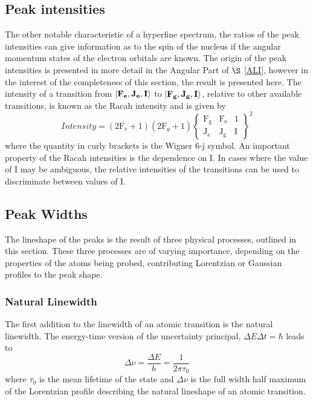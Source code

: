 \subsection{Peak intensities} 
The other notable characteristic of a hyperfine spectrum, the ratios of the peak intensities can give information as to the spin of the nucleus if the angular momentum states of the electron orbitals are known. The origin of the peak intensities is presented in more detail in the Angular Part of $\S$ \ref{ALI}, however in the interest of the completeness of this section, the result is presented here. The intensity of a transition from $\ket{\mathrm{\bf{F}_e,\bf{J}_e,I}}$ to $\ket{\mathrm{\bf{F}_g,\bf{J}_g,I}}$, relative to other available transitions, is known as the Racah intensity and is given by
\begin{equation}
Intensity = (2\mathrm{F}_e+1)(2\mathrm{F}_g+1)
\left\lbrace
\mathrm{
\begin{matrix}
\mathrm{F_g} & \mathrm{F_e} & 1\\
\mathrm{J_e} & \mathrm{J_g} & \mathrm{I} 
\end{matrix}
}
\right\rbrace^2
\label{RACAH}
\end{equation}
where the quantity in curly brackets is the Wigner 6-j symbol\cite{TomT}. An important property of the Racah intensities is the dependence on I. In cases where the value of I may be ambiguous, the relative intensities of the transitions can be used to discriminate between values of I.
\subsection{Peak Widths}
The lineshape of the peaks is the result of three physical processes, outlined in this section. These three processes are of varying importance, depending on the properties of the atoms being probed, contributing Lorentzian or Gaussian profiles to the peak shape. 

\subsubsection{Natural Linewidth}
The first addition to the linewidth of an atomic transition is the natural linewidth. The energy-time version of the uncertainty principal, $\Delta E \Delta t= \hbar$ leads to 
\begin{equation}
\Delta \nu = \frac{\Delta E}{h}=\frac{1}{2 \pi \tau_0}
\end{equation}
where $\tau_0$ is the mean lifetime of the state and $\Delta \nu$ is the full width half maximum of the Lorentzian profile describing the natural lineshape of an atomic transition\cite{TomT}.

